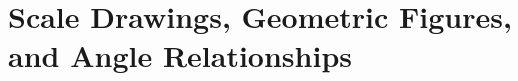 \documentclass[12pt, fleqn, openany, oneside]{studyGuide}
\begin{document}

\chapter{Scale Drawings, Geometric Figures, and Angle Relationships}














\printAnswerKey
\end{document}
